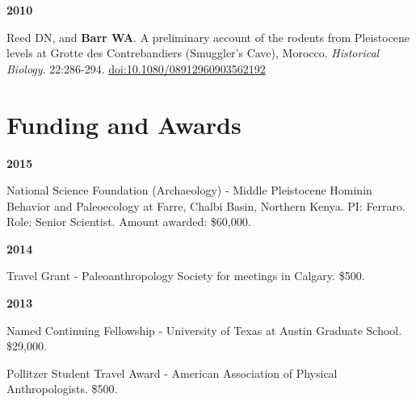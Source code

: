 \documentclass{article}
\begin{document}
\begin{description*}
\item[] {\bfseries 2010}
\item[] Reed DN, and {\bfseries Barr WA}. A preliminary account of the rodents from Pleistocene levels at Grotte des Contrebandiers (Smuggler's Cave),
Morocco. \emph{Historical Biology}. 22:286-294. \href{http://dx.doi.org/10.1080/08912960903562192}{doi:10.1080/08912960903562192}
\end{description*}


\section*{Funding and Awards}



\begin{description*}
\item[] {\bfseries 2015}
\item[] National Science Foundation (Archaeology) - Middle Pleistocene Hominin Behavior and Paleoecology at Farre, Chalbi Basin, Northern Kenya. PI: Ferraro. Role: Senior Scientist.  Amount awarded: \$60,000.
\end{description*}


\begin{description*}
\item[] {\bfseries 2014}
\item[] Travel Grant - Paleoanthropology Society for meetings in Calgary. \$500.
\end{description*}


\begin{description*}
\item[] {\bfseries 2013}
\item[] Named Continuing Fellowship - University of Texas at Austin Graduate School. \$29,000.
\item[] Pollitzer Student Travel Award - American Association of Physical Anthropologists. \$500.
\end{description*}
\end{document}
